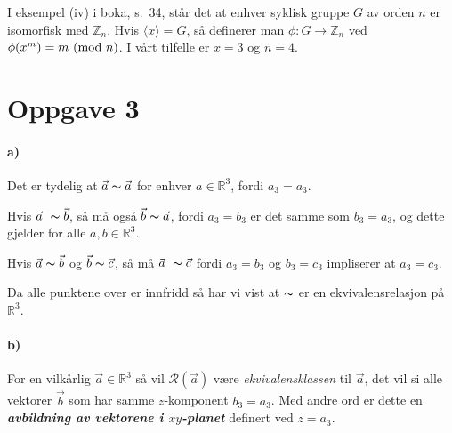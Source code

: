 \documentclass[a4paper,norsk,twocolumn,10pt]{article}
\begin{document}
I eksempel (iv) i boka, s.~34, står det at enhver syklisk gruppe $G$ av orden
$n$ er isomorfisk med $\mathbb{Z}_n$. Hvis $\langle x \rangle = G$, så
definerer man $\phi\colon G \rightarrow \mathbb{Z}_n$ ved $\phi{(x^m)} = m
\ (\text{mod}\ n)$. I vårt tilfelle er $x=3$ og $n=4$.

\section*{Oppgave 3}

\paragraph{\textbf{a)}}
Det er tydelig at $\vec{a} \thicksim \vec{a}$ for enhver $a\in \mathbb{R}^3$,
fordi $a_3=a_3$.

Hvis $\vec{a} \thicksim \vec{b}$, så må også $\vec{b} \thicksim \vec{a}$, fordi
$a_3=b_3$ er det samme som $b_3=a_3$, og dette gjelder for alle $a,b \in
\mathbb{R}^3$.

Hvis $\vec{a} \thicksim \vec{b}$ og $\vec{b} \thicksim \vec{c}$, så må
$\vec{a} \thicksim \vec{c}$ fordi $a_3=b_3$ og $b_3=c_3$ impliserer at
$a_3=c_3$.

Da alle punktene over er innfridd så har vi vist at $\thicksim$ er en
ekvivalensrelasjon på $\mathbb{R}^3$.

\paragraph{\textbf{b)}}
For en vilkårlig $\vec{a} \in \mathbb{R}^3$ så vil $\mathscr{R}(\vec{a})$ være
\textit{ekvivalensklassen} til $\vec{a}$, det vil si alle vektorer $\vec{b}$
som har samme $z$-komponent $b_3=a_3$. Med andre ord er dette en
\textbf{\textit{avbildning av vektorene i $xy$-planet}}
definert ved $z=a_3$.
\end{document}

